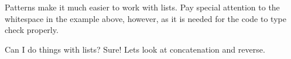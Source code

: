 \documentclass{lecturenotes}
\begin{document}
Patterns make it much easier to work with lists.
Pay special attention to the whitespace in the example above, however, as it is needed for the code to type check properly.

\vspace{0.2in}

\noindent Can I do things with lists? Sure! Lets look at concatenation and reverse.

\begin{center}
    \begin{code}%
%
\>[8]\AgdaSpace{}%
\AgdaSpace{}%
\AgdaOperator{\AgdaFunction{\AgdaUnderscore{}++\AgdaUnderscore{}}}\<%
\\
%
\\[\AgdaEmptyExtraSkip]%
%
\>[8]\AgdaOperator{\AgdaFunction{\AgdaUnderscore{}++\AgdaUnderscore{}}}\AgdaSpace{}%
\AgdaSymbol{:}\AgdaSpace{}%
\AgdaSpace{}%
\AgdaSymbol{\{}\AgdaSpace{}%
\AgdaSymbol{:}\AgdaSpace{}%
\AgdaSymbol{\}}\AgdaSpace{}%
\AgdaSymbol{->}\AgdaSpace{}%
\AgdaSpace{}%
\AgdaSpace{}%
\AgdaSymbol{->}\AgdaSpace{}%
\AgdaSpace{}%
\AgdaSpace{}%
\AgdaSymbol{->}\AgdaSpace{}%
\AgdaSpace{}%
\<%
\\
%
\>[8]\AgdaInductiveConstructor{[]}\AgdaSpace{}%
\AgdaOperator{\AgdaFunction{++}}\AgdaSpace{}%
\AgdaSpace{}%
\AgdaSymbol{=}\AgdaSpace{}%
\<%
\\
%
\>[8]\AgdaSymbol{(}\AgdaSpace{}%
\AgdaSpace{}%
\AgdaSymbol{)}\AgdaSpace{}%
\AgdaOperator{\AgdaFunction{++}}\AgdaSpace{}%
\AgdaSpace{}%
\AgdaSymbol{=}\AgdaSpace{}%
\AgdaSpace{}%
\AgdaSpace{}%
\AgdaSymbol{(}\AgdaSpace{}%
\AgdaOperator{\AgdaFunction{++}}\AgdaSpace{}%
\AgdaSymbol{)}\<%
\\
%
\\[\AgdaEmptyExtraSkip]%
%
\>[8]\AgdaSpace{}%
\AgdaSymbol{:}\AgdaSpace{}%
\AgdaSpace{}%
\AgdaSymbol{\{}\AgdaSpace{}%
\AgdaSymbol{:}\AgdaSpace{}%
\AgdaSymbol{\}}\AgdaSpace{}%
\AgdaSymbol{->}\AgdaSpace{}%
\AgdaSpace{}%
\AgdaSpace{}%
\AgdaSymbol{->}\AgdaSpace{}%
\AgdaSpace{}%
\<%
\\
%
\>[8]\AgdaSpace{}%
\AgdaInductiveConstructor{[]}\AgdaSpace{}%
\AgdaSymbol{=}\AgdaSpace{}%
\AgdaInductiveConstructor{[]}\<%
\\
%
\>[8]\AgdaSpace{}%
\AgdaSymbol{(}\AgdaSpace{}%
\AgdaSpace{}%
\AgdaSymbol{)}\AgdaSpace{}%
\AgdaSymbol{=}\AgdaSpace{}%
\AgdaSpace{}%
\AgdaSpace{}%
\AgdaOperator{\AgdaFunction{++}}\AgdaSpace{}%
\AgdaOperator{\AgdaInductiveConstructor{[}}\AgdaSpace{}%
\AgdaSpace{}%
\AgdaOperator{\AgdaInductiveConstructor{]}}\<%
\end{code}
\end{center}
\end{document}
